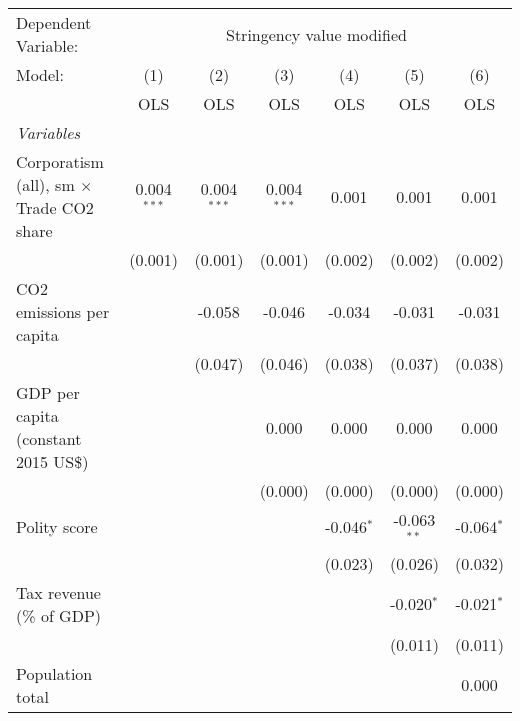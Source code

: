 
\begingroup
\centering
\begin{tabular}{lcccccc}
   \toprule
   Dependent Variable: & \multicolumn{6}{c}{Stringency value modified}\\
   Model:                                          & (1)           & (2)           & (3)           & (4)          & (5)           & (6)\\  
                                                   &  OLS          & OLS           & OLS           & OLS          & OLS           & OLS\\  
   \midrule
   \emph{Variables}\\
   Corporatism (all), sm $\times$ Trade CO2 share  & 0.004$^{***}$ & 0.004$^{***}$ & 0.004$^{***}$ & 0.001        & 0.001         & 0.001\\   
                                                   & (0.001)       & (0.001)       & (0.001)       & (0.002)      & (0.002)       & (0.002)\\   
   CO2 emissions per capita                        &               & -0.058        & -0.046        & -0.034       & -0.031        & -0.031\\   
                                                   &               & (0.047)       & (0.046)       & (0.038)      & (0.037)       & (0.038)\\   
   GDP per capita (constant 2015 US\$)             &               &               & 0.000         & 0.000        & 0.000         & 0.000\\   
                                                   &               &               & (0.000)       & (0.000)      & (0.000)       & (0.000)\\   
   Polity score                                    &               &               &               & -0.046$^{*}$ & -0.063$^{**}$ & -0.064$^{*}$\\   
                                                   &               &               &               & (0.023)      & (0.026)       & (0.032)\\   
   Tax revenue (\% of GDP)                         &               &               &               &              & -0.020$^{*}$  & -0.021$^{*}$\\   
                                                   &               &               &               &              & (0.011)       & (0.011)\\   
   Population total                                &               &               &               &              &               & 0.000\\   

\end{tabular}
